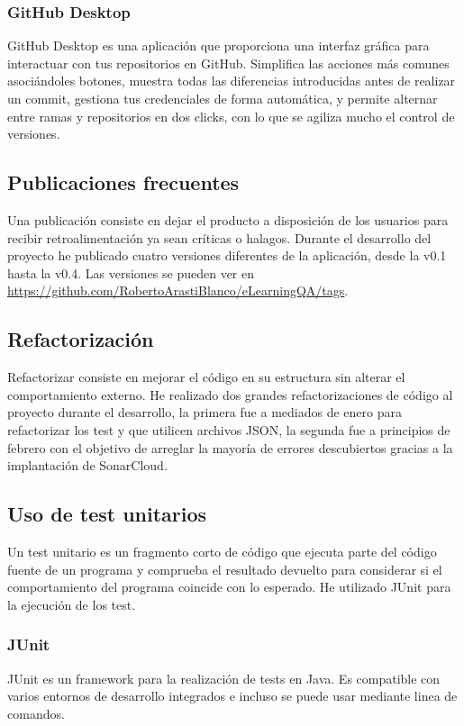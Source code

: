 \subsubsection{GitHub Desktop}
GitHub Desktop es una aplicación que proporciona una interfaz gráfica para interactuar con tus repositorios en GitHub. Simplifica las acciones más comunes asociándoles botones, muestra todas las diferencias introducidas antes de realizar un commit, gestiona tus credenciales de forma automática, y permite alternar entre ramas y repositorios en dos clicks, con lo que se agiliza mucho el control de versiones.
\subsection{Publicaciones frecuentes}
Una publicación consiste en dejar el producto a disposición de los usuarios para recibir retroalimentación ya sean críticas o halagos. Durante el desarrollo del proyecto he publicado cuatro versiones diferentes de la aplicación, desde la v0.1 hasta la v0.4. 
Las versiones se pueden ver en \url{https://github.com/RobertoArastiBlanco/eLearningQA/tags}.
\subsection{Refactorización}
Refactorizar consiste en mejorar el código en su estructura sin alterar el comportamiento externo. He realizado dos grandes refactorizaciones de código al proyecto durante el desarrollo, la primera fue a mediados de enero para refactorizar los test y que utilicen archivos JSON, la segunda fue a principios de febrero con el objetivo de arreglar la mayoría de errores descubiertos gracias a la implantación de SonarCloud.
\subsection{Uso de test unitarios}
Un test unitario es un fragmento corto de código que ejecuta parte del código fuente de un programa y comprueba el resultado devuelto para considerar si el comportamiento del programa coincide con lo esperado. He utilizado JUnit para la ejecución de los test.
\subsubsection{JUnit}
JUnit es un framework para la realización de tests en Java. Es compatible con varios entornos de desarrollo integrados e incluso se puede usar mediante linea de comandos.

